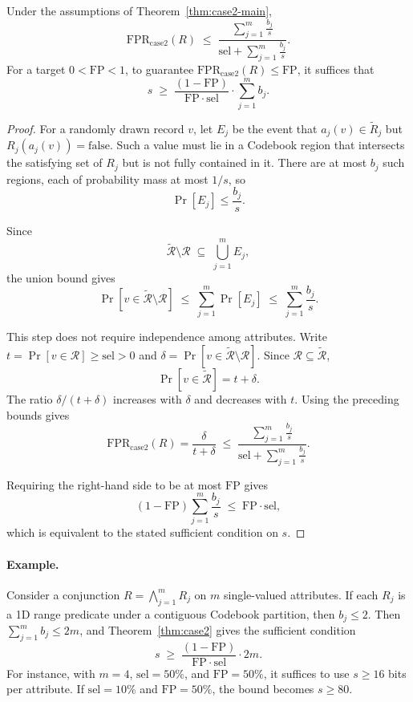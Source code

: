 \begin{theorem}
\label{thm:case2}
Under the assumptions of Theorem~\ref{thm:case2-main},
\[
\mathrm{FPR}_{\mathrm{case2}}(R)
\;\le\;
\frac{\sum_{j=1}^{m} \frac{b_j}{s}}
{\mathrm{sel} + \sum_{j=1}^{m} \frac{b_j}{s}}.
\]
For a target $0<\mathrm{FP}<1$, to guarantee
$\mathrm{FPR}_{\mathrm{case2}}(R)\le \mathrm{FP}$, it suffices that
\[
s
\;\ge\;
\frac{(1-\mathrm{FP})}{\mathrm{FP}\cdot \mathrm{sel}}
\cdot
\sum_{j=1}^{m} b_j.
\]
\end{theorem}

\begin{proof}
For a randomly drawn record $v$, let $E_j$ be the event that
$a_j(v)\in\widetilde R_j$ but $R_j(a_j(v))=\text{false}$.
Such a value must lie in a Codebook region that intersects the satisfying set of
$R_j$ but is not fully contained in it.
There are at most $b_j$ such regions, each of probability mass at most $1/s$, so
\[
\Pr[E_j] \le \frac{b_j}{s}.
\]

Since
\[
\widetilde{\mathcal{R}}\setminus \mathcal{R}
\;\subseteq\;
\bigcup_{j=1}^{m} E_j,
\]
the union bound gives
\[
\Pr[v\in \widetilde{\mathcal{R}}\setminus \mathcal{R}]
\;\le\;
\sum_{j=1}^{m} \Pr[E_j]
\;\le\;
\sum_{j=1}^{m} \frac{b_j}{s}.
\]

This step does not require independence among attributes.
Write $t=\Pr[v\in\mathcal R]\ge\mathrm{sel}>0$ and
$\delta=\Pr[v\in\widetilde{\mathcal R}\setminus\mathcal R]$.
Since $\mathcal R\subseteq\widetilde{\mathcal R}$,
\[
\Pr[v\in\widetilde{\mathcal R}] = t+\delta.
\]
The ratio $\delta/(t+\delta)$ increases with $\delta$ and decreases with $t$.
Using the preceding bounds gives
\[
\mathrm{FPR}_{\mathrm{case2}}(R)
=
\frac{\delta}{t+\delta}
\;\le\;
\frac{\sum_{j=1}^{m} \frac{b_j}{s}}
{\mathrm{sel} + \sum_{j=1}^{m} \frac{b_j}{s}}.
\]

Requiring the right-hand side to be at most $\mathrm{FP}$ gives
\[
(1-\mathrm{FP}) \sum_{j=1}^{m} \frac{b_j}{s}
\;\le\;
\mathrm{FP}\cdot \mathrm{sel},
\]
which is equivalent to the stated sufficient condition on $s$.
\end{proof}

\paragraph{Example.}
Consider a conjunction $R=\bigwedge_{j=1}^{m} R_j$ on $m$ single-valued attributes.
If each $R_j$ is a 1D range predicate under a contiguous Codebook partition, then
$b_j\le 2$.
Then $\sum_{j=1}^{m} b_j \le 2m$, and Theorem~\ref{thm:case2} gives the sufficient
condition
\[
s \;\ge\; \frac{(1-\mathrm{FP})}{\mathrm{FP}\cdot \mathrm{sel}} \cdot 2m.
\]
For instance, with $m=4$, $\mathrm{sel}=50\%$, and $\mathrm{FP}=50\%$, it suffices to use
$s \ge 16$ bits per attribute.
If $\mathrm{sel}=10\%$ and $\mathrm{FP}=50\%$, the bound becomes $s \ge 80$.

